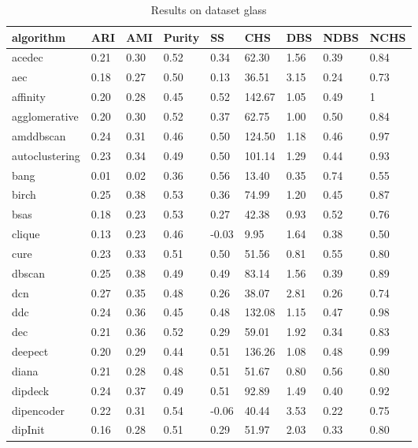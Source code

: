 \begin{table}[H]
\centering
\caption{Results on dataset glass}
\label{tab:params:glass}
\begin{tabular}{|l|l|l|l|l|l|l|l|l|}
\hline
algorithm & ARI & AMI & Purity & SS & CHS & DBS & NDBS & NCHS \\
\hline
acedec & 0.21 & 0.30 & 0.52 & 0.34 & 62.30 & 1.56 & 0.39 & 0.84 \\
\hline
aec & 0.18 & 0.27 & 0.50 & 0.13 & 36.51 & 3.15 & 0.24 & 0.73 \\
\hline
affinity & 0.20 & 0.28 & 0.45 & 0.52 & 142.67 & 1.05 & 0.49 & 1 \\
\hline
agglomerative & 0.20 & 0.30 & 0.52 & 0.37 & 62.75 & 1.00 & 0.50 & 0.84 \\
\hline
amddbscan & 0.24 & 0.31 & 0.46 & 0.50 & 124.50 & 1.18 & 0.46 & 0.97 \\
\hline
autoclustering & 0.23 & 0.34 & 0.49 & 0.50 & 101.14 & 1.29 & 0.44 & 0.93 \\
\hline
bang & 0.01 & 0.02 & 0.36 & 0.56 & 13.40 & 0.35 & 0.74 & 0.55 \\
\hline
birch & 0.25 & 0.38 & 0.53 & 0.36 & 74.99 & 1.20 & 0.45 & 0.87 \\
\hline
bsas & 0.18 & 0.23 & 0.53 & 0.27 & 42.38 & 0.93 & 0.52 & 0.76 \\
\hline
clique & 0.13 & 0.23 & 0.46 & -0.03 & 9.95 & 1.64 & 0.38 & 0.50 \\
\hline
cure & 0.23 & 0.33 & 0.51 & 0.50 & 51.56 & 0.81 & 0.55 & 0.80 \\
\hline
dbscan & 0.25 & 0.38 & 0.49 & 0.49 & 83.14 & 1.56 & 0.39 & 0.89 \\
\hline
dcn & 0.27 & 0.35 & 0.48 & 0.26 & 38.07 & 2.81 & 0.26 & 0.74 \\
\hline
ddc & 0.24 & 0.36 & 0.45 & 0.48 & 132.08 & 1.15 & 0.47 & 0.98 \\
\hline
dec & 0.21 & 0.36 & 0.52 & 0.29 & 59.01 & 1.92 & 0.34 & 0.83 \\
\hline
deepect & 0.20 & 0.29 & 0.44 & 0.51 & 136.26 & 1.08 & 0.48 & 0.99 \\
\hline
diana & 0.21 & 0.28 & 0.48 & 0.51 & 51.67 & 0.80 & 0.56 & 0.80 \\
\hline
dipdeck & 0.24 & 0.37 & 0.49 & 0.51 & 92.89 & 1.49 & 0.40 & 0.92 \\
\hline
dipencoder & 0.22 & 0.31 & 0.54 & -0.06 & 40.44 & 3.53 & 0.22 & 0.75 \\
\hline
dipInit & 0.16 & 0.28 & 0.51 & 0.29 & 51.97 & 2.03 & 0.33 & 0.80 \\

\end{tabular}
\end{table}
